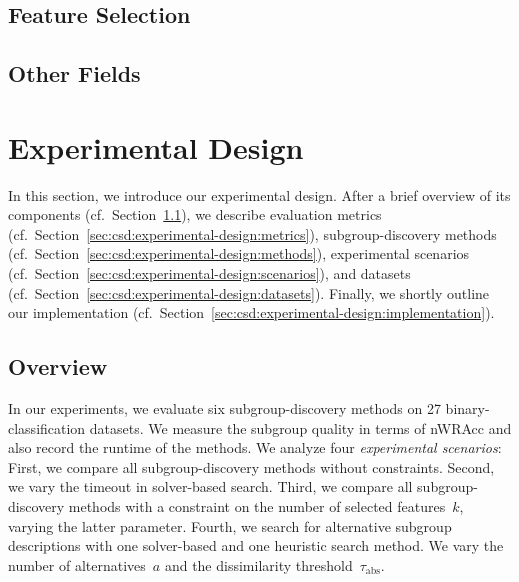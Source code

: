 \documentclass{article}
\theoremstyle{definition}
\begin{document}
\subsection{Feature Selection}
\label{sec:csd:related-work:feature-selection}

\cite{bach2022empirical} \cite{bach2023finding}

\subsection{Other Fields}
\label{sec:csd:related-work:other}

\cite{bailey2014alternative} \cite{grossi2017survey}
\cite{guidotti2022counterfactual}
\cite{narodytska2018learning} \cite{schidler2021sat} \cite{yu2021learning}

\section{Experimental Design}
\label{sec:csd:experimental-design}

In this section, we introduce our experimental design.
After a brief overview of its components (cf.~Section~\ref{sec:csd:experimental-design:overview}), we describe evaluation metrics (cf.~Section~\ref{sec:csd:experimental-design:metrics}), subgroup-discovery methods (cf.~Section~\ref{sec:csd:experimental-design:methods}), experimental scenarios (cf.~Section~\ref{sec:csd:experimental-design:scenarios}), and datasets (cf.~Section~\ref{sec:csd:experimental-design:datasets}).
Finally, we shortly outline our implementation (cf.~Section~\ref{sec:csd:experimental-design:implementation}).

\subsection{Overview}
\label{sec:csd:experimental-design:overview}

In our experiments, we evaluate six subgroup-discovery methods on 27 binary-classification datasets.
We measure the subgroup quality in terms of nWRAcc and also record the runtime of the methods.
We analyze four \emph{experimental scenarios}:
First, we compare all subgroup-discovery methods without constraints.
Second, we vary the timeout in solver-based search.
Third, we compare all subgroup-discovery methods with a constraint on the number of selected features~$k$, varying the latter parameter.
Fourth, we search for alternative subgroup descriptions with one solver-based and one heuristic search method.
We vary the number of alternatives~$a$ and the dissimilarity threshold~$\tau_{\text{abs}}$.
\end{document}
